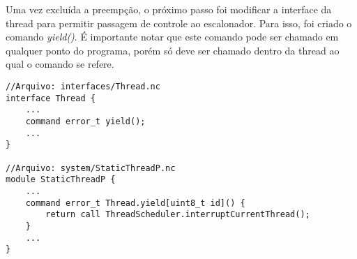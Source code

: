 Uma vez excluída a preempção, o próximo passo foi modificar a interface da thread para permitir passagem de controle ao
escalonador. Para isso, foi criado o comando \textit{yield()}. É importante notar que este comando pode ser chamado em 
qualquer ponto do programa, porém só deve ser chamado dentro da thread ao qual o comando se refere.
\begin{lstlisting}
//Arquivo: interfaces/Thread.nc
interface Thread {
    ...
    command error_t yield();
    ...
}

//Arquivo: system/StaticThreadP.nc
module StaticThreadP {
    ...
    command error_t Thread.yield[uint8_t id]() { 
        return call ThreadScheduler.interruptCurrentThread(); 
    } 
    ...
}
\end{lstlisting}



